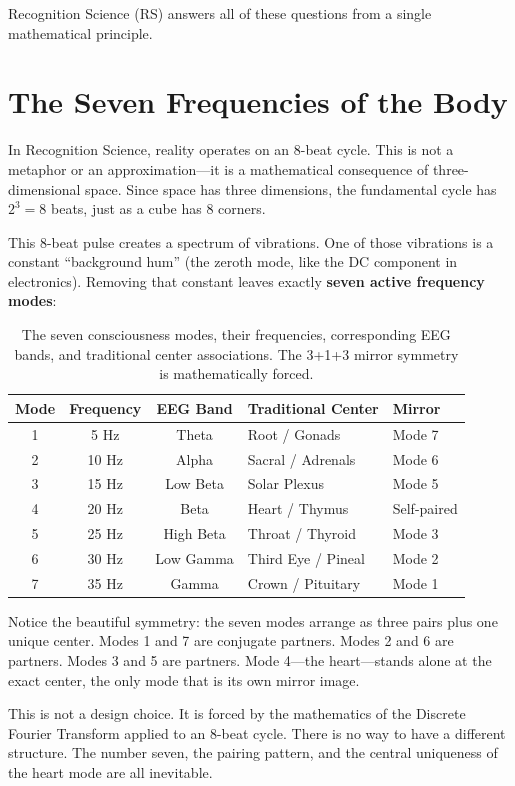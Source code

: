 \documentclass[11pt,a4paper]{article}
\begin{document}
Recognition Science (RS) answers all of these questions from a single mathematical principle.

\section{The Seven Frequencies of the Body}

In Recognition Science, reality operates on an 8-beat cycle. This is not a metaphor or an approximation---it is a mathematical consequence of three-dimensional space. Since space has three dimensions, the fundamental cycle has $2^3 = 8$ beats, just as a cube has 8 corners.

This 8-beat pulse creates a spectrum of vibrations. One of those vibrations is a constant ``background hum'' (the zeroth mode, like the DC component in electronics). Removing that constant leaves exactly \textbf{seven active frequency modes}:

\begin{table}[h]
\centering
\begin{tabular}{cccll}
\toprule
\textbf{Mode} & \textbf{Frequency} & \textbf{EEG Band} & \textbf{Traditional Center} & \textbf{Mirror} \\
\midrule
1 & 5 Hz & Theta & Root / Gonads & Mode 7 \\
2 & 10 Hz & Alpha & Sacral / Adrenals & Mode 6 \\
3 & 15 Hz & Low Beta & Solar Plexus & Mode 5 \\
4 & 20 Hz & Beta & Heart / Thymus & Self-paired \\
5 & 25 Hz & High Beta & Throat / Thyroid & Mode 3 \\
6 & 30 Hz & Low Gamma & Third Eye / Pineal & Mode 2 \\
7 & 35 Hz & Gamma & Crown / Pituitary & Mode 1 \\
\bottomrule
\end{tabular}
\caption{The seven consciousness modes, their frequencies, corresponding EEG bands, and traditional center associations. The 3+1+3 mirror symmetry is mathematically forced.}
\end{table}

Notice the beautiful symmetry: the seven modes arrange as three pairs plus one unique center. Modes 1 and 7 are conjugate partners. Modes 2 and 6 are partners. Modes 3 and 5 are partners. Mode 4---the heart---stands alone at the exact center, the only mode that is its own mirror image.

This is not a design choice. It is forced by the mathematics of the Discrete Fourier Transform applied to an 8-beat cycle. There is no way to have a different structure. The number seven, the pairing pattern, and the central uniqueness of the heart mode are all inevitable.
\end{document}
